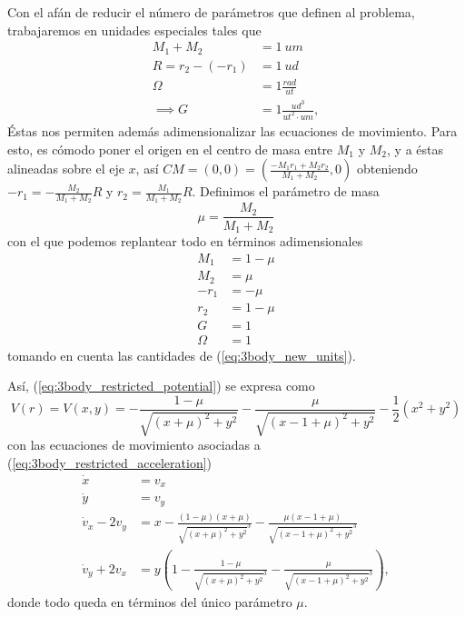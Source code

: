 Con el afán de reducir el número de parámetros que definen al problema, trabajaremos en unidades especiales tales que 
\begin{align}
 M_1 + M_2 &= 1 \ um \nonumber \\
 R = r_2 - (-r_1) &= 1 \ ud \nonumber \\
 \Omega &= 1 \frac{rad}{ut} \nonumber \\
 \implies G &= 1 \frac{ud^3}{ut^2 \cdot um},
 \label{eq:3body_new_units}
\end{align}
Éstas nos permiten además adimensionalizar las ecuaciones de movimiento. Para esto, es cómodo poner el origen en el centro de masa entre $M_1$ y $M_2$, y a éstas alineadas sobre el eje $x$, así $CM = (0,0) = (\frac{-M_1r_1 + M_2r_2}{M_1 + M_2}, 0)$ obteniendo $-r_1 = -\frac{M_2}{M_1+M_2}R$ y $r_2 =\frac{M_1}{M_1+M_2}R$. Definimos el parámetro de masa 
\begin{equation*}
 \mu = \frac{M_2}{M_1 + M_2} 
\end{equation*}
con el que podemos replantear todo en términos adimensionales
\begin{align}
 M_1 &= 1 - \mu \nonumber \\
 M_2 &= \mu \nonumber \\
 -r_1 &= -\mu \nonumber \\
 r_2 &= 1 - \mu \nonumber \\
 G &= 1 \nonumber \\
 \Omega &= 1
 \label{eq:3body_adimensional_units}
\end{align}
tomando en cuenta las cantidades de (\ref{eq:3body_new_units}).

Así, (\ref{eq:3body_restricted_potential}) se expresa como
\begin{equation}
 V(r) = V(x,y) = -\frac{1 - \mu}{\sqrt{(x + \mu)^2 + y^2}} -  \frac{\mu}{\sqrt{(x - 1 + \mu)^2 + y^2}} - \frac{1}{2} \left(x^2 + y^2 \right)
\end{equation}
con las ecuaciones de movimiento asociadas a (\ref{eq:3body_restricted_acceleration})
\begin{align}
 \dot{x} &= v_x \\
 \dot{y} &= v_y \\
 \dot{v}_x - 2v_y &=  x - \frac{(1 - \mu) (x+\mu)}{\sqrt{ (x+\mu)^2 + y^2 }^3} - \frac{\mu (x - 1 + \mu) }{\sqrt{(x - 1 +  \mu)^2 + y^2}^3 } \\ 
 \dot{v}_y + 2v_x &= y \left( 1 - \frac{ 1 - \mu }{\sqrt{(x+\mu)^2 + y^2}^3} - \frac{\mu}{\sqrt{(x - 1 + \mu)^2 + y^2}^3} \right),
 \label{eq:3body_restricted_ eqs_motion}
\end{align}
donde todo queda en términos del único parámetro $\mu$.

